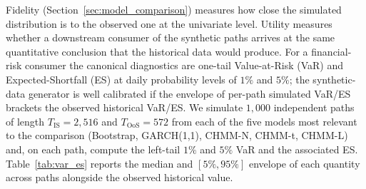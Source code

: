 Fidelity (Section~\ref{sec:model_comparison}) measures how close the simulated distribution is to the observed one at the univariate level.
Utility measures whether a downstream consumer of the synthetic paths arrives at the same quantitative conclusion that the historical data would produce.
For a financial-risk consumer the canonical diagnostics are one-tail Value-at-Risk (VaR) and Expected-Shortfall (ES) at daily probability levels of $1\%$ and $5\%$; the synthetic-data generator is well calibrated if the envelope of per-path simulated VaR/ES brackets the observed historical VaR/ES.
We simulate $1{,}000$ independent paths of length $T_{\text{IS}} = 2{,}516$ and $T_{\text{OoS}} = 572$ from each of the five models most relevant to the comparison (Bootstrap, GARCH(1,1), CHMM-N, CHMM-t, CHMM-L) and, on each path, compute the left-tail $1\%$ and $5\%$ VaR and the associated ES.
Table~\ref{tab:var_es} reports the median and $[5\%, 95\%]$ envelope of each quantity across paths alongside the observed historical value.

